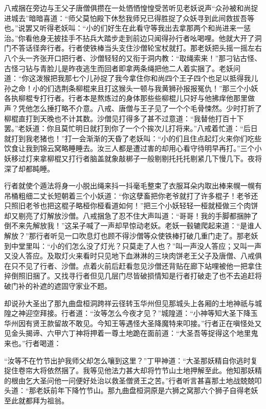 \documentclass[12pt,UTF8]{ctexbook}
\begin{document}
{	八戒捆在旁边与王父子唐僧俱攒在一处恓恓惶惶受苦听见老妖说声“众孙被和尚捉进城去”暗暗喜道：“师父莫怕殿下休愁我师兄已得胜捉了众妖寻到此间救拔吾等也。”说罢又听得老妖叫：“小的们好生在此看守等我出去拿那两个和尚进来一惩治。”你看他身无披挂手不拈兵大踏步走到前边只闻得孙行者吆喝哩。他就大开了洞门不答话径奔行者。行者使铁棒当头支住沙僧轮宝杖就打。那老妖把头摇一摇左右八个头一齐张开口把行者、沙僧轻轻的又衔于洞内教：“取绳索来！”那刁钻古怪、古怪刁钻与青脸儿是昨夜逃生而回者即拿两条绳把他二人着实捆了。老妖问道：“你这泼猴把我那七个儿孙捉了我今拿住你和尚四个王子四个也足以抵得我儿孙之命！小的们选荆条柳棍来且打这猴头一顿与我黄狮孙报报冤仇！”那三个小妖各执柳棍专打行者。行者本是熬炼过的身体那些些柳棍儿只好与他拂痒他那里做声？凭他怎么捶打略不介意。八戒、唐僧与王子见了一个个毛骨悚然。少时打折了柳棍直打到天晚也不计其数。沙僧见打得多了甚不过意道：“我替他打百十下罢。”老妖道：你且莫忙明日就打到你了一个个挨次儿打将来。”八戒着忙道：“后日就打到我老猪也！”打一会渐渐的天昏了老妖叫：“小的们且住点起灯火来你们吃些饮食让我到锦云窝略睡睡去。汝三人都是遭过害的却用心看守待明早再打。”三个小妖移过灯来拿柳棍又打行者脑盖就象敲梆子一般剔剔托托托剔紧几下慢几下。夜将深了却都盹睡。
	
	行者就使个遁法将身一小脱出绳来抖一抖毫毛整束了衣服耳朵内取出棒来幌一幌有吊桶粗细二丈长短朝着三个小妖道：“你这孽畜把你老爷就打了许多棍子！老爷还只照旧老爷也把这棍子略桠你桠看道如何！”把三个小妖轻轻一桠就桠做三个肉饼却又剔亮了灯解放沙僧。八戒捆急了忍不住大声叫道：“哥哥！我的手脚都捆肿了倒不来先解放我！”这呆子喊了一声却早惊动老妖。老妖一毂辘爬起来道：“是谁人解放？”那行者听见一口吹息灯也顾不得沙僧等众使铁棒打破几重门走了。那老妖到中堂里叫：“小的们怎么没了灯光？只莫走了人也？”叫一声没人答应；又叫一声又没人答应。及取灯火来看时只见地下血淋淋的三块肉饼老王父子及唐僧、八戒俱在只不见了行者、沙僧。点着火前后赶看忽见沙僧还背贴在廊下站哩被他一把拿住捽倒照旧捆了。又找寻行者但见几层门尽皆破损情知是行者打破走了也不去追赶将破门补的补遮的遮固守家业不题。
	
	却说孙大圣出了那九曲盘桓洞跨祥云径转玉华州但见那城头上各厢的土地神祇与城隍之神迎空拜接。行者道：“汝等怎么今夜才见？”城隍道：“小神等知大圣下降玉华州因有贤王款留故不敢见。今知王等遇怪大圣降魔特来叩接。”行者正在嗔怪处又见金头揭谛、六甲六丁神将押着一尊土地跪在面前道：“大圣吾等捉得这个地里鬼来也。”行者喝道：
	
	“汝等不在竹节出护我师父却怎么嚷到这里？”丁甲神道：“大圣那妖精自你逃时复捉住卷帘大将依然捆了。我等见他法力甚大却将竹节山土地押解至此。他知那妖精的根由乞大圣问他一问便好处治以救圣僧贤王之苦。”行者听言甚喜那土地战兢兢叩头道：“那老妖前年下降竹节山。那九曲盘桓洞原是六狮之窝那六个狮子自得老妖至此就都拜为祖翁。
	
}
\end{document}
